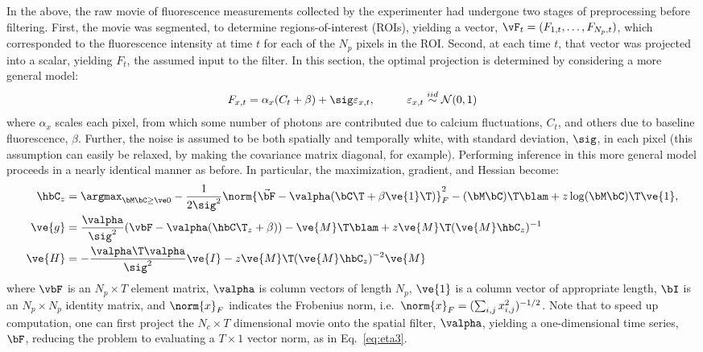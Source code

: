 In the above, the raw movie of fluorescence measurements collected by the experimenter had undergone two stages of preprocessing before filtering.  First, the movie was segmented, to determine regions-of-interest (ROIs), yielding a vector, $\vF_t=(F_{1,t}, \ldots, F_{N_p,t})$, which corresponded to the fluorescence intensity at time $t$ for each of the $N_p$ pixels in the ROI.  Second, at each time $t$, that vector was projected into a scalar, yielding $F_t$, the assumed input to the filter.  In this section, the optimal projection is determined by considering a more general model:
\begin{align} \label{eq:bF}
F_{x,t} &= \alpha_x (C_t + \beta) +  \sig \varepsilon_{x,t}, \qquad &\varepsilon_{x,t} \overset{iid}{\sim} \mathcal{N}(0,1)   
\end{align}
\noindent where $\alpha_x$ scales each pixel, from which some number of photons are contributed due to calcium fluctuations, $C_t$, and others due to baseline fluorescence, $\beta$.  Further, the noise is assumed to be both spatially and temporally white, with standard deviation, $\sig$, in each pixel (this assumption can easily be relaxed, by making the covariance matrix diagonal, for example).  Performing inference in this more general model proceeds in a  nearly identical manner as before. In particular, the maximization, gradient, and Hessian become:
\begin{align} 
\hbC_{\zzz} 
&= \az  -\frac{1}{2 \sig^2} \norm{\vec{\bF} - \valpha (\bC\T +\beta\ve{1}\T)}_F^2 - (\bM \bC )\T \blam  + \zzz \log(\bM \bC)\T\ve{1},  \label{eq:eta4}\\
\ve{g} &= \frac{\valpha}{\sig^2}(\vbF -\valpha({\hbC\T}_{\zzz} + \beta)) - \ve{M}\T\blam + \zzz \ve{M}\T (\ve{M} \hbC_{\zzz})^{-1} \label{eq:g2} \\
\ve{H} &= -\frac{\valpha\T \valpha}{\sig^2} \ve{I} - \zzz \ve{M}\T (\ve{M} \hbC_{\zzz})^{-2} \ve{M} \label{eq:H2}
\end{align}
\noindent where $\vbF$ is an $N_p \times T$ element matrix, $\valpha$ is column vectors of length $N_p$, $\ve{1}$ is  a column vector of appropriate length, $\bI$ is an $N_p \times N_p$ identity matrix, and $\norm{x}_F$ indicates the Frobenius norm, i.e.\ $\norm{x}_F= (\sum_{i,j} x_{i,j}^2)^{-1/2}$.  Note that to speed up computation, one can first project the $N_c \times T$ dimensional movie onto the spatial filter, $\valpha$, yielding a one-dimensional time series, $\bF$, reducing the problem to evaluating a $T \times 1$ vector norm, as in Eq.~\eqref{eq:eta3}.

